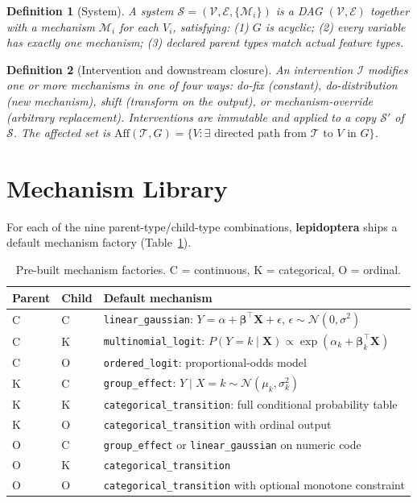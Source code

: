 \documentclass[12pt,a4paper]{article}
\newcommand{\pkg}[1]{\textbf{#1}}
\newcommand{\code}[1]{\texttt{#1}}
\newtheorem{definition}{Definition}
\begin{document}
\begin{definition}[System]
A \emph{system} $\mathcal{S} = (\mathcal{V}, \mathcal{E}, \{\mathcal{M}_i\})$ is a DAG $(\mathcal{V},\mathcal{E})$ together with a mechanism $\mathcal{M}_i$ for each $V_i$, satisfying: (1) $G$ is acyclic; (2) every variable has exactly one mechanism; (3) declared parent types match actual feature types.
\end{definition}

\begin{definition}[Intervention and downstream closure]
An \emph{intervention} $\mathcal{I}$ modifies one or more mechanisms in one of four ways: \emph{do-fix} (constant), \emph{do-distribution} (new mechanism), \emph{shift} (transform on the output), or \emph{mechanism-override} (arbitrary replacement). Interventions are immutable and applied to a copy $\mathcal{S}'$ of $\mathcal{S}$. The \emph{affected set} is $\mathrm{Aff}(\mathcal{T},G) = \{V : \exists\text{ directed path from }\mathcal{T}\text{ to }V\text{ in }G\}$.
\end{definition}

\section{Mechanism Library}
\label{sec:mechanisms}

For each of the nine parent-type/child-type combinations, \pkg{lepidoptera} ships a default mechanism factory (Table~\ref{tab:mechanisms}).

\begin{table}[ht]
\centering
\caption{Pre-built mechanism factories. C = continuous, K = categorical, O = ordinal.}
\label{tab:mechanisms}
\small
\begin{tabular}{llp{8cm}}
\toprule
Parent & Child & Default mechanism \\
\midrule
C & C & \code{linear\_gaussian}: $Y = \alpha + \boldsymbol{\beta}^\top \mathbf{X} + \epsilon$, $\epsilon\sim\mathcal{N}(0,\sigma^2)$ \\
C & K & \code{multinomial\_logit}: $P(Y\!=\!k\mid\mathbf{X})\propto\exp(\alpha_k+\boldsymbol{\beta}_k^\top\mathbf{X})$ \\
C & O & \code{ordered\_logit}: proportional-odds model \citep{mccullagh1980regression} \\
K & C & \code{group\_effect}: $Y\mid X\!=\!k\sim\mathcal{N}(\mu_k,\sigma_k^2)$ \\
K & K & \code{categorical\_transition}: full conditional probability table \\
K & O & \code{categorical\_transition} with ordinal output \\
O & C & \code{group\_effect} or \code{linear\_gaussian} on numeric code \\
O & K & \code{categorical\_transition} \\
O & O & \code{categorical\_transition} with optional monotone constraint \\
\bottomrule
\end{tabular}
\end{table}
\end{document}
